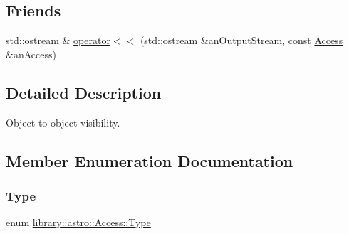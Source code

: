 \subsection*{Friends}
\begin{DoxyCompactItemize}
\item 
std\+::ostream \& \hyperlink{classlibrary_1_1astro_1_1_access_a84eabd1ef8d3eeff0b6a80851727a2b4}{operator$<$$<$} (std\+::ostream \&an\+Output\+Stream, const \hyperlink{classlibrary_1_1astro_1_1_access}{Access} \&an\+Access)
\end{DoxyCompactItemize}


\subsection{Detailed Description}
Object-\/to-\/object visibility. 

\subsection{Member Enumeration Documentation}
\mbox{\label{classlibrary_1_1astro_1_1_access_a2574b0e3f1e5ecca60471ccd04b9ff45}} 
\subsubsection{\texorpdfstring{Type}{Type}}
{\footnotesize\ttfamily enum \hyperlink{classlibrary_1_1astro_1_1_access_a2574b0e3f1e5ecca60471ccd04b9ff45}{library\+::astro\+::\+Access\+::\+Type}\hspace{0.3cm}{\ttfamily [strong]}}

